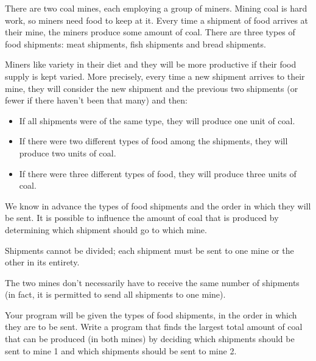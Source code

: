 There are two coal mines, each employing a group of miners. Mining coal is hard work, so miners need food to keep at it. Every time a shipment of food arrives at their mine, the miners produce some amount of coal. There are three types of food shipments: meat shipments, fish shipments and bread shipments.

Miners like variety in their diet and they will be more productive if their food supply is kept varied. More precisely, every time a new shipment arrives to their mine, they will consider the new shipment and the previous two shipments (or fewer if there haven't been that many) and then:

\begin{itemize}
\item If all shipments were of the same type, they will produce one unit of coal.

\item If there were two different types of food among the shipments, they will produce two units of coal.

\item If there were three different types of food, they will produce three units of coal.
\end{itemize}

We know in advance the types of food shipments and the order in which they will be sent. It is possible to influence the amount of coal that is produced by determining which shipment should go to which mine.

Shipments cannot be divided; each shipment must be sent to one mine or the other in its entirety.

The two mines don't necessarily have to receive the same number of shipments (in fact, it is permitted to send all shipments to one mine).

Your program will be given the types of food shipments, in the order in which they are to be sent. Write a program that finds the largest total amount of coal that can be produced (in both mines) by deciding which shipments should be sent to mine 1 and which shipments should be sent to mine 2.